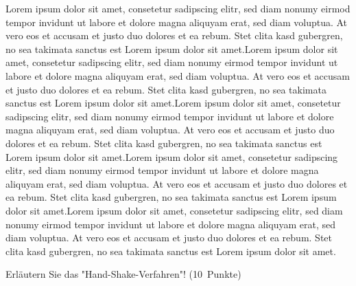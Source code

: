 \documentclass[addpoints,a4paper,ngerman,10pt,answers]{exam}
\begin{document}
\begin{questions}
\ifprintanswers
\begin{minipage}{0.7\textwidth}
\begin{solution}
\parbox[t][][t]{0.8\textwidth}{Lorem ipsum dolor sit amet, consetetur sadipscing elitr, sed diam nonumy eirmod tempor invidunt ut labore et dolore magna aliquyam erat, sed diam voluptua. At vero eos et accusam et justo duo dolores et ea rebum. Stet clita kasd gubergren, no sea takimata sanctus est Lorem ipsum dolor sit amet.Lorem ipsum dolor sit amet, consetetur sadipscing elitr, sed diam nonumy eirmod tempor invidunt ut labore et dolore magna aliquyam erat, sed diam voluptua. At vero eos et accusam et justo duo dolores et ea rebum. Stet clita kasd gubergren, no sea takimata sanctus est Lorem ipsum dolor sit amet.Lorem ipsum dolor sit amet, consetetur sadipscing elitr, sed diam nonumy eirmod tempor invidunt ut labore et dolore magna aliquyam erat, sed diam voluptua. At vero eos et accusam et justo duo dolores et ea rebum. Stet clita kasd gubergren, no sea takimata sanctus est Lorem ipsum dolor sit amet.Lorem ipsum dolor sit amet, consetetur sadipscing elitr, sed diam nonumy eirmod tempor invidunt ut labore et dolore magna aliquyam erat, sed diam voluptua. At vero eos et accusam et justo duo dolores et ea rebum. Stet clita kasd gubergren, no sea takimata sanctus est Lorem ipsum dolor sit amet.Lorem ipsum dolor sit amet, consetetur sadipscing elitr, sed diam nonumy eirmod tempor invidunt ut labore et dolore magna aliquyam erat, sed diam voluptua. At vero eos et accusam et justo duo dolores et ea rebum. Stet clita kasd gubergren, no sea takimata sanctus est Lorem ipsum dolor sit amet.}
\end{solution}
\end{minipage}
\else
{}
\fi
\vspace{1cm}
\question[10] \parbox[t][][t]{0.68\textwidth}{Erläutern Sie das "Hand-Shake-Verfahren"!
\linebreak(10\ Punkte)}


\end{questions}
\end{document}
